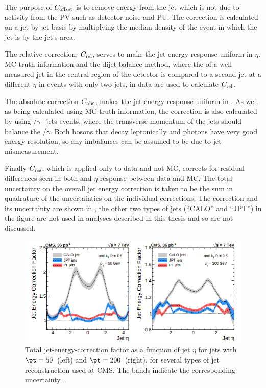 The purpose of $C_{\rm{offset}}$ is to remove energy from the jet which is not due to activity from the \ac{PV} such as detector noise and \ac{PU}. The correction is calculated on a jet-by-jet basis by multiplying the median \pt density of the event in which the jet is by the jet's area. 

The relative correction, $C_{\rm{rel}}$, serves to make the jet energy response uniform in $\eta$. \ac{MC} truth information and the dijet \pt balance method, where the \pt of a well measured jet in the central region of the detector is compared to a second jet at a different $\eta$ in events with only two jets, in data are used to calculate $C_{\rm{rel}}$.

The absolute correction $C_{\rm{abs}}$, makes the jet energy response uniform in \pt. As well as being calculated using \ac{MC} truth information, the correction is also calculated by using \PZ$/\gamma$+jets events, where the transverse momentum of the jets should balance the \PZ$/\gamma$. Both \PZ bosons that decay leptonically and photons have very good energy resolution, so any imbalances can be assumed to be due to jet mismeasurement.

Finally $C_{\rm{res}}$, which is applied only to data and not \ac{MC}, corrects for residual differences seen in both \pt and $\eta$ response between data and \ac{MC}. The total uncertainty on the overall jet energy correction is taken to be the sum in quadrature of the uncertainties on the individual corrections. The correction and its uncertainty are shown in , the other two types of jets (``CALO'' and ``JPT'') in the figure are not used in analyses described in this thesis and so are not discussed.

\begin{figure}
  \includegraphics[width=1.2\largefigwidth]{plots/obj/jec.png}
  \caption{Total jet-energy-correction factor as a function of jet $\eta$ for jets with $\pt=50$\GeV\, (left) and $\pt=200$\GeV\, (right), for several types of jet reconstruction used at CMS. The bands indicate the corresponding uncertainty~\cite{CMS-JME-10-011}.}
  \label{fig:jec}
\end{figure}
